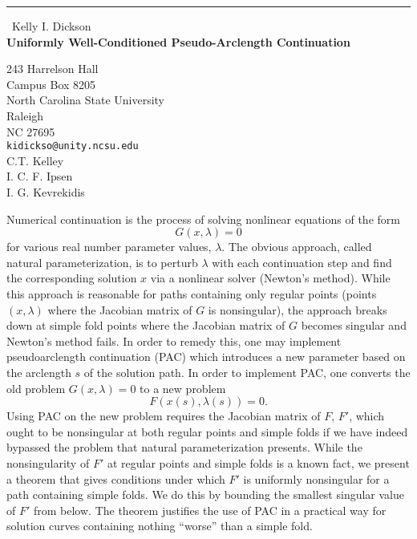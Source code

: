 \documentclass{report}
\begin{document}
\begin{center}
\rule{6in}{1pt} \
{\large Kelly I. Dickson \\
{\bf Uniformly Well-Conditioned Pseudo-Arclength Continuation}}

243 Harrelson Hall \\ Campus Box 8205 \\ North Carolina State University \\ Raleigh \\ NC 27695
\\
{\tt kidickso@unity.ncsu.edu}\\
C.T. Kelley\\
I. C. F. Ipsen\\
	I. G. Kevrekidis\end{center}

Numerical continuation is the process of solving nonlinear equations of the form
\[G(x,\lambda)=0\]
for various real number parameter values, $\lambda$. The obvious
approach, called natural parameterization, is to perturb $\lambda$ with
each continuation step and find the corresponding solution $x$ via a
nonlinear solver (Newton's method). While this approach is reasonable for
paths containing only regular points (points $(x,\lambda)$ where the
Jacobian matrix of $G$ is nonsingular), the approach breaks down at
simple fold points where the Jacobian matrix of $G$ becomes singular and
Newton's method fails. In order to remedy this, one may implement
pseudoarclength continuation (PAC) which introduces a new parameter based
on the arclength $s$ of the solution path. In order to implement PAC, one
converts the old problem $G(x,\lambda)=0$ to a new problem
\[F(x(s),\lambda(s))=0.\]
Using PAC on the new problem requires the Jacobian matrix of $F$, $F'$,
which ought to be nonsingular at both regular points and simple folds if
we have indeed bypassed the problem that natural parameterization
presents. While the nonsingularity of $F'$ at regular points and simple
folds is a known fact, we present a theorem that gives conditions under
which $F'$ is uniformly nonsingular for a path containing simple folds.
We do this by bounding the smallest singular value of $F'$ from below.
The theorem justifies the use of PAC in a practical way for solution
curves containing nothing ``worse'' than a simple fold.
\end{document}
